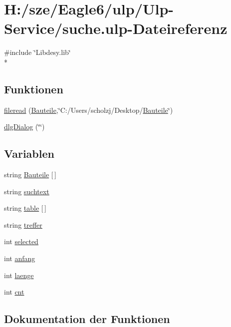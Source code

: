 \hypertarget{suche_8ulp}{}\section{H\+:/sze/\+Eagle6/ulp/\+Ulp-\/\+Service/suche.ulp-\/\+Dateireferenz}
\label{suche_8ulp}
{\ttfamily \#include \char`\"{}Libdesy.\+lib\char`\"{}}\\*
\subsection*{Funktionen}
\begin{DoxyCompactItemize}
\item 
\hyperlink{suche_8ulp_ab06931dc8540fb5e7a8b2c707186a295}{fileread} (\hyperlink{suche_8ulp_a093b50ecdc1cc55a1997cfbb25356737}{Bauteile},\char`\"{}C\+:/Users/scholzj/Desktop/\hyperlink{suche_8ulp_a093b50ecdc1cc55a1997cfbb25356737}{Bauteile}\char`\"{})
\item 
\hyperlink{suche_8ulp_abc5e2c5bfe828c9bd28ed667f19cf117}{dlg\+Dialog} (\char`\"{}\char`\"{})
\end{DoxyCompactItemize}
\subsection*{Variablen}
\begin{DoxyCompactItemize}
\item 
string \hyperlink{suche_8ulp_a093b50ecdc1cc55a1997cfbb25356737}{Bauteile} \mbox{[}$\,$\mbox{]}
\item 
string \hyperlink{suche_8ulp_aecdc9611136768cc5b5f6d17bf551706}{suchtext}
\item 
string \hyperlink{suche_8ulp_af47537269e0310e36e1939d5c06b4880}{table} \mbox{[}$\,$\mbox{]}
\item 
string \hyperlink{suche_8ulp_a69c65182de5042fc6e8abefd0d0e175e}{treffer}
\item 
int \hyperlink{suche_8ulp_adab4da51ba40d5a492becdceccccbfcd}{selected}
\item 
int \hyperlink{suche_8ulp_a849a04f99c5ce8583f3eb4fc6e7416a8}{anfang}
\item 
int \hyperlink{suche_8ulp_a5094b708df9b2d68a8bc53f236aa0a0e}{laenge}
\item 
int \hyperlink{suche_8ulp_a9cfbb269728dc4185236d28be58d9eab}{cnt}
\end{DoxyCompactItemize}


\subsection{Dokumentation der Funktionen}
\hypertarget{suche_8ulp_abc5e2c5bfe828c9bd28ed667f19cf117}{}
